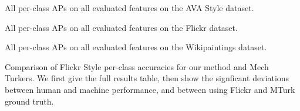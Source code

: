 \begin{table*}[h!]
\caption{
    All per-class APs on all evaluated features on the AVA Style dataset.
}\label{tab:ava_style_ap_table}
\vspace{1em}
\centering
\small{

}
\end{table*}

\begin{table*}[h!]
\caption{
    All per-class APs on all evaluated features on the Flickr dataset.
}\label{tab:flickr_ap_table}
\vspace{1em}
\centering

\end{table*}

\begin{table*}[h!]
\centering
\caption{
    All per-class APs on all evaluated features on the Wikipaintings dataset.
}\label{tab:wikipaintings_ap_table}
\vspace{1em}

\end{table*}

\begin{table*}[h!]
\caption
[Comparison of Flickr Style per-class accuracies for our method and Mech Turkers.]
{
Comparison of Flickr Style per-class accuracies for our method and Mech Turkers.
We first give the full results table, then show the signficant deviations between human and machine performance, and between using Flickr and MTurk ground truth.
}\label{tab:flickr_vs_mturk}
\vspace{1em}
\centering
\small{

}
\end{table*}

